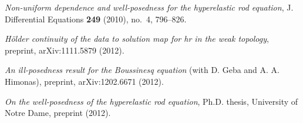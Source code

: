 \documentclass[12pt]{article}
\begin{document}
\nocite{Geba:2012}
\nocite{Karapetyan:2010fk}
\nocite{Karapetyan:2011}
\nocite{Karapetyan:2012}
\large
\providecommand{\bysame}{\leavevmode\hbox to3em{\hrulefill}\thinspace}
\providecommand{\MR}{\relax\ifhmode\unskip\space\fi MR }
\providecommand{\MRhref}[2]{%
  \href{http://www.ams.org/mathscinet-getitem?mr=#1}{#2}
}
\providecommand{\href}[2]{#2}
\begin{thebibliography}{1}

\href{http://davidkarapetyan.com/pdfs/hr-nud-2010.pdf}{\emph{Non-uniform dependence and well-posedness for the
hyperelastic rod equation}}, J. Differential Equations \textbf{249} (2010),
  no.~4, 796--826.

\href{http://arxiv.org/abs/1111.5879}{\emph{H{\"o}lder continuity of the data to solution map for hr in the
weak topology}}, preprint, arXiv:1111.5879 (2012).

\href{http://arxiv.org/abs/1202.6671}{\emph{An
ill-posedness result for the Boussinesq equation}} (with D. Geba and A. A. Himonas), preprint, arXiv:1202.6671
  (2012).

\href{http://davidkarapetyan.com/pdfs/thesis.pdf}{\emph{On the well-posedness of the hyperelastic rod equation}}, Ph.D.
thesis, University of Notre Dame, preprint (2012).

\end{thebibliography}
        
        
\end{document}
